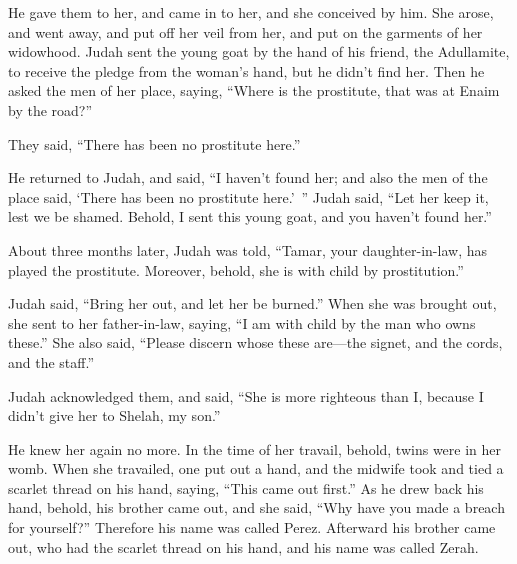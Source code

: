 {\par }{\PP He gave them to her, and came in to her, and she conceived by him.
She arose, and went away, and put off her veil from her, and put on the garments of her widowhood.
Judah sent the young goat by the hand of his friend, the Adullamite, to receive the pledge from the woman’s hand, but he didn’t find her.
Then he asked the men of her place, saying, “Where is the prostitute, that was at Enaim by the road?”
\par }{\PP They said, “There has been no prostitute here.”
\par }{\PP {}He returned to Judah, and said, “I haven’t found her; and also the men of the place said, ‘There has been no prostitute here.’ ”
Judah said, “Let her keep it, lest we be shamed. Behold, I sent this young goat, and you haven’t found her.”
\par }{\PP {}About three months later, Judah was told, “Tamar, your daughter-in-law, has played the prostitute. Moreover, behold, she is with child by prostitution.”
\par }{\PP Judah said, “Bring her out, and let her be burned.”
When she was brought out, she sent to her father-in-law, saying, “I am with child by the man who owns these.” She also said, “Please discern whose these are—the signet, and the cords, and the staff.”
\par }{\PP {}Judah acknowledged them, and said, “She is more righteous than I, because I didn’t give her to Shelah, my son.”
\par }{\PP He knew her again no more.
In the time of her travail, behold, twins were in her womb.
When she travailed, one put out a hand, and the midwife took and tied a scarlet thread on his hand, saying, “This came out first.”
As he drew back his hand, behold, his brother came out, and she said, “Why have you made a breach for yourself?” Therefore his name was called Perez.
Afterward his brother came out, who had the scarlet thread on his hand, and his name was called Zerah.

}
